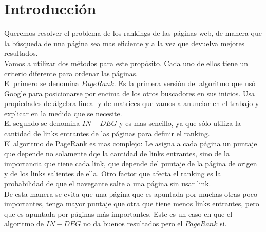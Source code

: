 \section{Introducción}

Queremos resolver el problema de los rankings de las páginas web, de manera que la búsqueda de una página sea mas eficiente y a la vez que devuelva mejores resultados. \\

Vamos a utilizar dos métodos para este propósito. Cada uno de ellos tiene un criterio diferente para ordenar las páginas. \\

El primero se denomina $PageRank$. Es la primera versión del algoritmo que usó Google para posicionarse por encima de los otros buscadores en sus inicios. Usa propiedades de álgebra lineal y de matrices que vamos a anunciar en el trabajo y explicar en la medida que se necesite.\\

El segundo se denomina $IN-DEG$ y es mas sencillo, ya que sólo utiliza la cantidad de links entrantes de las páginas para definir el ranking.\\

El algoritmo de PageRank es mas complejo: Le asigna a cada página un puntaje que depende no solamente dqe la cantidad de links entrantes, sino de la importancia que tiene cada link, que depende del puntaje de la página de origen y de los links salientes de ella. Otro factor que afecta el ranking es la probabilidad de que el navegante salte a una página sin usar link. \\

De esta manera se evita que una página que es apuntada por muchas otras poco importantes, tenga mayor puntaje que otra que tiene menos links entrantes, pero que es apuntada por páginas más importantes. Este es un caso en que el algoritmo de $IN-DEG$ no da buenos resultados pero el $PageRank$ si.


